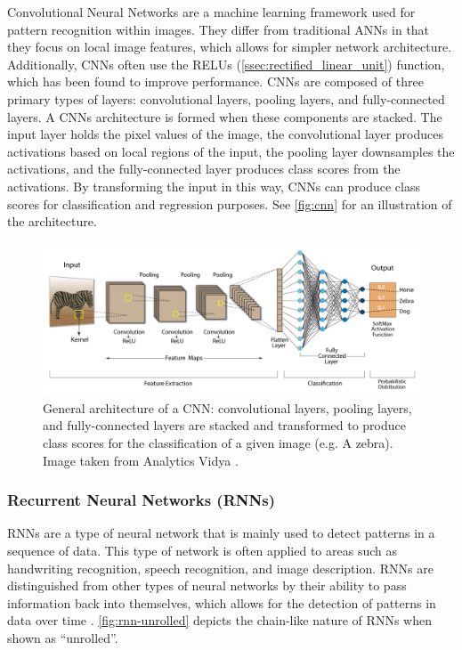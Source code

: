Convolutional Neural Networks are a machine learning framework used for pattern recognition within images. They differ from traditional ANNs in that they focus on local image features, which allows for simpler network architecture. Additionally, \glspl{CNN} often use the \glspl{RELU} (\autoref{ssec:rectified_linear_unit}) function, which has been found to improve performance. \glspl{CNN} are composed of three primary types of layers: convolutional layers, pooling layers, and fully-connected layers. A \glspl{CNN} architecture is formed when these components are stacked. The input layer holds the pixel values of the image, the convolutional layer produces activations based on local regions of the input, the pooling layer downsamples the activations, and the fully-connected layer produces class scores from the activations. By transforming the input in this way, \glspl{CNN} can produce class scores for classification and regression purposes. See \autoref{fig:cnn} for an illustration of the architecture.

\begin{figure}[h]
    \centering
    \captionsetup{format=hang} %
    \includegraphics[width=\textwidth]{graphics/cnn_banner.png}
    \caption{General architecture of a \gls{CNN}: convolutional layers, pooling layers, and fully-connected layers are stacked and transformed to produce class scores for the classification of a given image (e.g. A zebra). Image taken from Analytics Vidya \cite{vidhya_2022}.}
    \label{fig:cnn}
\end{figure}

\subsubsection{Recurrent Neural Networks (RNNs)}\label{ssec:rnn}

\Glspl{RNN} are a type of neural network that is mainly used to detect patterns in a sequence of data. This type of network is often applied to areas such as handwriting recognition, speech recognition, and image description. \Glspl{RNN} are distinguished from other types of neural networks by their ability to pass information back into themselves, which allows for the detection of patterns in data over time \cite{Schmidt2019}. \autoref{fig:rnn-unrolled} depicts the chain-like nature of \glspl{RNN} when shown as ``unrolled''.

